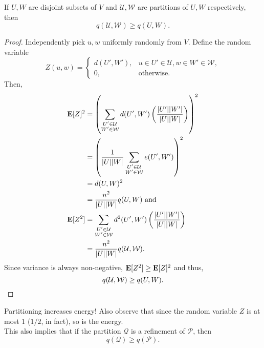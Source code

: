\documentclass{article}
\begin{document}
			\begin{lemma}
				\label{lemma: szemeredi lemma energy increases on partitioning}
				If $U,W$ are disjoint subsets of $V$ and $\mathcal{U},\mathcal{W}$ are partitions of $U,W$ respectively, then
				\[ q(\mathcal{U},\mathcal{W}) \ge q(U,W). \]
			\end{lemma}

			\begin{proof}
				Independently pick $u,w$ uniformly randomly from $V$. Define the random variable
				\[ Z(u,w) =
				\begin{cases}
					d(U', W'), & u \in U' \in \mathcal{U}, w \in W' \in \mathcal{W}, \\
					0, & \text{otherwise.}
				\end{cases}
				\]
				Then,
				\begin{align*}
					\textbf{E}[Z]^2 &= \left(\sum_{\substack{U' \in \mathcal{U} \\ W' \in \mathcal{W}}} d(U',W') \left(\frac{|U'||W'|}{|U||W|}\right)\right)^2 \\
						&= \left(\frac{1}{|U||W|} \sum_{\substack{U' \in \mathcal{U} \\ W' \in \mathcal{W}}} e(U',W')\right)^2 \\
						&= d(U,W)^2 \\
						&= \frac{n^2}{|U||W|} q(U,W) \text{ and} \\
					\textbf{E}[Z^2] &= \sum_{\substack{U' \in \mathcal{U} \\ W' \in \mathcal{W}}} d^2(U',W') \left(\frac{|U'||W'|}{|U||W|}\right) \\
						&= \frac{n^2}{|U||W|} q(\mathcal{U},\mathcal{W}).
				\end{align*}
				Since variance is always non-negative, $\textbf{E}[Z^2] \ge \textbf{E}[Z]^2$ and thus,
				\[ q(\mathcal{U},\mathcal{W}) \ge q(U,W). \qedhere \]
			\end{proof}

			Partitioning increases energy! Also observe that since the random variable $Z$ is at most $1$ ($1/2$, in fact), so is the energy.\\
			This also implies that if the partition $\mathcal{Q}$ is a refinement of $\mathcal{P}$, then
			\[ q(\mathcal{Q}) \ge q(\mathcal{P}). \]
\end{document}
